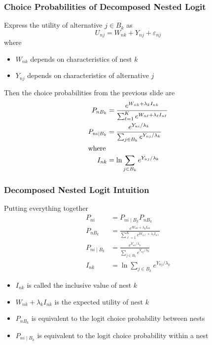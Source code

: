 \documentclass{beamer}
\begin{document}
\begin{frame}\frametitle{Choice Probabilities of Decomposed Nested Logit}
    Express the utility of alternative $j \in B_k$ as
    $$U_{nj} = W_{nk} + Y_{nj} + \varepsilon_{nj}$$
    where
    \begin{itemize}
    	\item $W_{nk}$ depends on characteristics of nest $k$
    	\item $Y_{nj}$ depends on characteristics of alternative $j$
    \end{itemize}
    \vspace{2ex}
    Then the choice probabilities from the previous slide are
    \begin{align*}
    	P_{nB_k} &= \frac{e^{W_{nk} + \lambda_k I_{nk}}}{\sum_{\ell = 1}^K e^{W_{n \ell} + \lambda_{\ell} I_{n \ell}}} \\
    	P_{ni \mid B_k} &= \frac{e^{Y_{ni} / \lambda_k}}{\sum_{j \in B_k} e^{Y_{nj} / \lambda_k}} \\
    	\intertext{where}
    	I_{nk} &= \ln \sum_{j \in B_k} e^{Y_{nj} / \lambda_k}
    \end{align*}
\end{frame}

\begin{frame}\frametitle{Decomposed Nested Logit Intuition}
	Putting everything together
    \begin{align*}
    	P_{ni} &= P_{ni \mid B_k} P_{nB_k} \\
    	P_{nB_k} &= \frac{e^{W_{nk} + \lambda_k I_{nk}}}{\sum_{\ell = 1}^K e^{W_{n \ell} + \lambda_{\ell} I_{n \ell}}} \\
    	P_{ni \mid B_k} &= \frac{e^{Y_{ni} / \lambda_k}}{\sum_{j \in B_k} e^{Y_{nj} / \lambda_k}} \\
    	I_{nk} &= \ln \sum_{j \in B_k} e^{Y_{nj} / \lambda_k}
    \end{align*}
    \begin{itemize}
    	\item $I_{nk}$ is called the inclusive value of nest $k$
    	\item $W_{nk} + \lambda_k I_{nk}$ is the expected utility of nest $k$
    	\item $P_{nB_k}$ is equivalent to the logit choice probability between nests
    	\item $P_{ni \mid B_k}$ is equivalent to the logit choice probability within a nest
    \end{itemize}
\end{frame}
\end{document}

